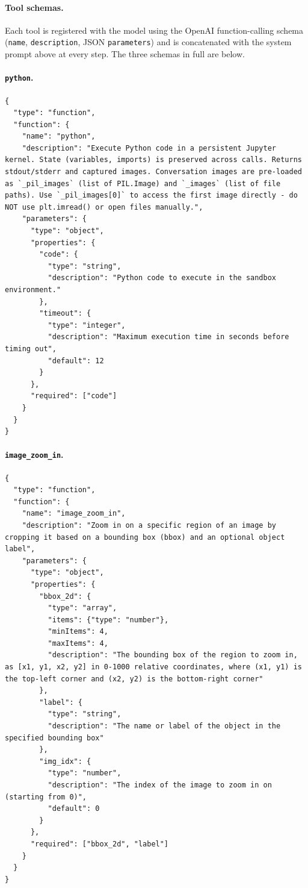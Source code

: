 \paragraph{Tool schemas.}
Each tool is registered with the model using the OpenAI function-calling schema (\texttt{name}, \texttt{description}, JSON \texttt{parameters}) and is concatenated with the system prompt above at every step. The three schemas in full are below.

\paragraph{\texttt{python}.}
\begin{Verbatim}[fontsize=\small, breaklines=true, breakanywhere=true, breakindent=2em]
{
  "type": "function",
  "function": {
    "name": "python",
    "description": "Execute Python code in a persistent Jupyter kernel. State (variables, imports) is preserved across calls. Returns stdout/stderr and captured images. Conversation images are pre-loaded as `_pil_images` (list of PIL.Image) and `_images` (list of file paths). Use `_pil_images[0]` to access the first image directly - do NOT use plt.imread() or open files manually.",
    "parameters": {
      "type": "object",
      "properties": {
        "code": {
          "type": "string",
          "description": "Python code to execute in the sandbox environment."
        },
        "timeout": {
          "type": "integer",
          "description": "Maximum execution time in seconds before timing out",
          "default": 12
        }
      },
      "required": ["code"]
    }
  }
}
\end{Verbatim}

\paragraph{\texttt{image\_zoom\_in}.}
\begin{Verbatim}[fontsize=\small, breaklines=true, breakanywhere=true, breakindent=2em]
{
  "type": "function",
  "function": {
    "name": "image_zoom_in",
    "description": "Zoom in on a specific region of an image by cropping it based on a bounding box (bbox) and an optional object label",
    "parameters": {
      "type": "object",
      "properties": {
        "bbox_2d": {
          "type": "array",
          "items": {"type": "number"},
          "minItems": 4,
          "maxItems": 4,
          "description": "The bounding box of the region to zoom in, as [x1, y1, x2, y2] in 0-1000 relative coordinates, where (x1, y1) is the top-left corner and (x2, y2) is the bottom-right corner"
        },
        "label": {
          "type": "string",
          "description": "The name or label of the object in the specified bounding box"
        },
        "img_idx": {
          "type": "number",
          "description": "The index of the image to zoom in on (starting from 0)",
          "default": 0
        }
      },
      "required": ["bbox_2d", "label"]
    }
  }
}
\end{Verbatim}

